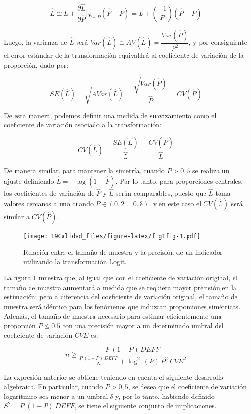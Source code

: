 \documentclass[
  12pt,
  spanish,
]{book}
\begin{document}
\[
\hat{L} \cong L + \frac{\partial \hat{L}}{\partial \hat{P}}\biggr\rvert_{\hat{P}=P} (\hat{P}-P) = L + \left(\frac{-1}{P}\right)(\hat{P}-P)
\]

Luego, la varianza de \(\hat{L}\) será \(Var(\hat{L})\cong AV(\hat{L}) = \dfrac{Var(\hat{P})}{P^2}\), y por consiguiente el error estándar de la transformación equivaldrá al coeficiente de variación de la proporción, dado por:

\[
SE(\hat{L}) = \sqrt{AVar(\hat{L})} = \dfrac{\sqrt{Var(\hat{P})}}{\hat{P}} = CV(\hat{P}) 
\]

De esta manera, podemos definir una medida de suavizamiento como el coeficiente de variación asociado a la transformación:

\[
CV(\hat{L}) = \dfrac{SE(\hat{L})}{\hat{L}} = \dfrac{CV(\hat{P})}{\hat{L}}
\]

De manera similar, para mantener la simetría, cuando \(P>0,5\) se realiza un ajuste definiendo \(\hat{L} = -\log(1-\hat{P})\). Por lo tanto, para proporciones centrales, los coeficientes de variación de \(\hat{P}\) y \(\hat{L}\) serán comparables, puesto que \(\hat{L}\) toma valores cercanos a uno cuando \(P \in (0,2\ \ ,\ \ 0,8)\), y en este caso el \(CV(\hat{L})\) será similar a \(CV(\hat{P})\).

\begin{figure}
\centering
\texttt{[image: 19Calidad\_files/figure-latex/fig1fig-1.pdf]}
\caption{\label{fig:fig1fig}Relación entre el tamaño de muestra y la precisión de un indicador utilizando la transformación Logit.}
\end{figure}

La figura \ref{fig:fig1fig} muestra que, al igual que con el coeficiente de variación original, el tamaño de muestra aumentará a medida que se requiera mayor precisión en la estimación; pero a diferencia del coeficiente de variación original, el tamaño de muestra será idéntico para los fenómenos que induzcan proporciones simétricas. Además, el tamaño de muestra necesario para estimar eficientemente una proporción \(P\leq 0.5\) con una precisión mayor a un determinado umbral del coeficiente de variación \(CVE\) es:

\[
n \geq \dfrac{P \ (1-P) \  DEFF}{\frac{P \  (1-P) \ DEFF}{N}+\log^2\ (P) \ P^2 \ CVE^2}
\]

La expresión anterior se obtiene teniendo en cuenta el siguiente desarrollo algebraico. En particular, cuando \(P > 0,5\), se desea que el coeficiente de variación logarítmico sea menor a un umbral \(\delta\) y, por lo tanto, habiendo definido \(S^2 = P\ (1-P) \  DEFF\), se tiene el siguiente conjunto de implicaciones.
\end{document}

